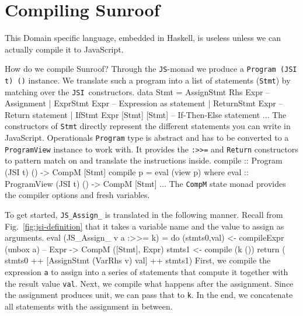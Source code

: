\documentclass{llncs}
\newcommand{\Src}[1]{{\tt{#1}}}
\newcommand{\JS}{\Src{JS}}
\newcommand{\JSI}{\Src{JSI}}
\newenvironment{Code}{\verbatim}{\endverbatim}
\newcommand{\FigRef}[1]{Fig.~\ref{#1}}
\begin{document}

\section{Compiling Sunroof}
\label{sec:compiler}

This Domain specific language, embedded in Haskell, is useless unless
we can actually compile it to JavaScript.

How do we compile Sunroof?
Through the \JS-monad we produce a \Src{Program (JSI t) ()} instance. We 
translate such a program into a list of statements (\Src{Stmt}) by matching over 
the \JSI~constructors.
\begin{Code}
data Stmt = AssignStmt Rhs Expr       -- Assignment
          | ExprStmt Expr             -- Expression as statement
          | ReturnStmt Expr           -- Return statement
          | IfStmt Expr [Stmt] [Stmt] -- If-Then-Else statement
          ...
\end{Code}
The constructors of \Src{Stmt} directly represent the 
different statements you can write in JavaScript.
%
Operationals \cite{Apfelmus:10:Operational,Hackage:10:Operational} 
\Src{Program} type is abstract and has to be converted 
to a \Src{ProgramView} instance to work with.
It provides the \Src{:>>=} and \Src{Return} constructors 
to pattern match on and translate the instructions inside.
\begin{Code}
compile :: Program (JSI t) () -> CompM [Stmt]
compile p = eval (view p)
  where eval :: ProgramView (JSI t) () -> CompM [Stmt]
        ...
\end{Code}
The \Src{CompM} state monad provides the compiler options and fresh variables.

To get started, \Src{JS\_Assign\_} is translated in the following manner. 
Recall from 
\FigRef{fig:jsi-definition} that it takes a variable name 
and the value to assign as arguments. %
\begin{Code}
eval (JS_Assign_ v a :>>= k) = do
  (stmts0,val) <- compileExpr (unbox a) -- Expr -> CompM ([Stmt], Expr)
  stmts1       <- compile (k ())
  return ( stmts0 ++ [AssignStmt (VarRhs v) val] ++ stmts1)
\end{Code}
First, we compile the expression \Src{a} to assign into a series of 
statements that compute it together with the result value \Src{val}.
Next, we compile what happens after the assignment. Since 
the assignment produces unit, we can pass that to \Src{k}.
In the end, we concatenate all statements with the assignment in between. 
\end{document}
